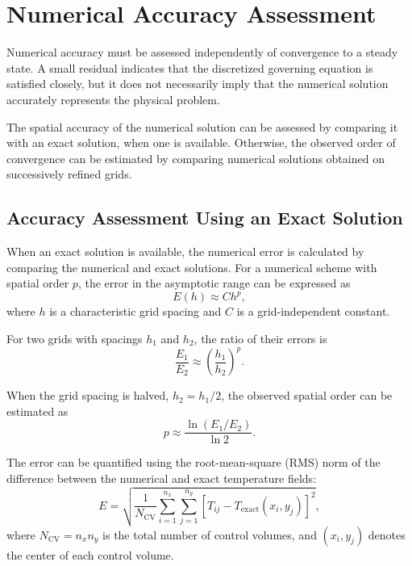\section{Numerical Accuracy Assessment}
\label{sec:numerical_accuracy}

Numerical accuracy must be assessed independently of convergence
to a steady state. A small residual indicates that the discretized
governing equation is satisfied closely, but it does not necessarily
imply that the numerical solution accurately represents the physical
problem.

The spatial accuracy of the numerical solution can be assessed
by comparing it with an exact solution, when one is available.
Otherwise, the observed order of convergence can be estimated by
comparing numerical solutions obtained on successively refined grids.

\subsection{Accuracy Assessment Using an Exact Solution}

When an exact solution is available, the numerical error is
calculated by comparing the numerical and exact solutions.
For a numerical scheme with spatial order $p$, the error in the
asymptotic range can be expressed as
\begin{equation}
E(h)\approx C h^p,
\label{eq:error_order_exact}
\end{equation}
where $h$ is a characteristic grid spacing and $C$ is a
grid-independent constant.

For two grids with spacings $h_1$ and $h_2$, the ratio of
their errors is
\begin{equation}
\frac{E_1}{E_2}
\approx
\left(\frac{h_1}{h_2}\right)^p.
\label{eq:error_ratio_exact}
\end{equation}

When the grid spacing is halved, $h_2=h_1/2$, the observed
spatial order can be estimated as
\begin{equation}
\boxed{
p\approx
\frac{\ln(E_1/E_2)}{\ln 2}.
}
\label{eq:order_exact}
\end{equation}

The error can be quantified using the root-mean-square (RMS)
norm of the difference between the numerical and exact
temperature fields:
\begin{equation}
E=
\sqrt{
\frac{1}{N_{\mathrm{CV}}}
\sum_{i=1}^{n_x}
\sum_{j=1}^{n_y}
\left[
T_{ij}-T_{\mathrm{exact}}(x_i,y_j)
\right]^2
},
\label{eq:exact_rms_error}
\end{equation}
where $N_{\mathrm{CV}}=n_xn_y$ is the total number of
control volumes, and $(x_i,y_j)$ denotes the center of
each control volume.


